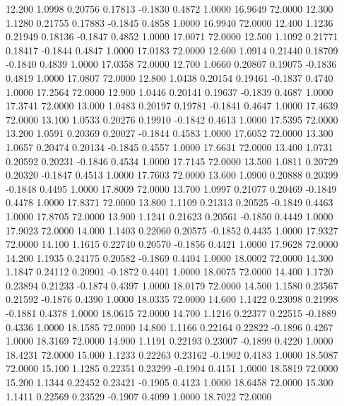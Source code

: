   12.200   1.0998   0.20756   0.17813  -0.1830   0.4872   1.0000  16.9649  72.0000
  12.300   1.1280   0.21755   0.17883  -0.1845   0.4858   1.0000  16.9940  72.0000
  12.400   1.1236   0.21949   0.18136  -0.1847   0.4852   1.0000  17.0071  72.0000
  12.500   1.1092   0.21771   0.18417  -0.1844   0.4847   1.0000  17.0183  72.0000
  12.600   1.0914   0.21440   0.18709  -0.1840   0.4839   1.0000  17.0358  72.0000
  12.700   1.0660   0.20807   0.19075  -0.1836   0.4819   1.0000  17.0807  72.0000
  12.800   1.0438   0.20154   0.19461  -0.1837   0.4740   1.0000  17.2564  72.0000
  12.900   1.0446   0.20141   0.19637  -0.1839   0.4687   1.0000  17.3741  72.0000
  13.000   1.0483   0.20197   0.19781  -0.1841   0.4647   1.0000  17.4639  72.0000
  13.100   1.0533   0.20276   0.19910  -0.1842   0.4613   1.0000  17.5395  72.0000
  13.200   1.0591   0.20369   0.20027  -0.1844   0.4583   1.0000  17.6052  72.0000
  13.300   1.0657   0.20474   0.20134  -0.1845   0.4557   1.0000  17.6631  72.0000
  13.400   1.0731   0.20592   0.20231  -0.1846   0.4534   1.0000  17.7145  72.0000
  13.500   1.0811   0.20729   0.20320  -0.1847   0.4513   1.0000  17.7603  72.0000
  13.600   1.0900   0.20888   0.20399  -0.1848   0.4495   1.0000  17.8009  72.0000
  13.700   1.0997   0.21077   0.20469  -0.1849   0.4478   1.0000  17.8371  72.0000
  13.800   1.1109   0.21313   0.20525  -0.1849   0.4463   1.0000  17.8705  72.0000
  13.900   1.1241   0.21623   0.20561  -0.1850   0.4449   1.0000  17.9023  72.0000
  14.000   1.1403   0.22060   0.20575  -0.1852   0.4435   1.0000  17.9327  72.0000
  14.100   1.1615   0.22740   0.20570  -0.1856   0.4421   1.0000  17.9628  72.0000
  14.200   1.1935   0.24175   0.20582  -0.1869   0.4404   1.0000  18.0002  72.0000
  14.300   1.1847   0.24112   0.20901  -0.1872   0.4401   1.0000  18.0075  72.0000
  14.400   1.1720   0.23894   0.21233  -0.1874   0.4397   1.0000  18.0179  72.0000
  14.500   1.1580   0.23567   0.21592  -0.1876   0.4390   1.0000  18.0335  72.0000
  14.600   1.1422   0.23098   0.21998  -0.1881   0.4378   1.0000  18.0615  72.0000
  14.700   1.1216   0.22377   0.22515  -0.1889   0.4336   1.0000  18.1585  72.0000
  14.800   1.1166   0.22164   0.22822  -0.1896   0.4267   1.0000  18.3169  72.0000
  14.900   1.1191   0.22193   0.23007  -0.1899   0.4220   1.0000  18.4231  72.0000
  15.000   1.1233   0.22263   0.23162  -0.1902   0.4183   1.0000  18.5087  72.0000
  15.100   1.1285   0.22351   0.23299  -0.1904   0.4151   1.0000  18.5819  72.0000
  15.200   1.1344   0.22452   0.23421  -0.1905   0.4123   1.0000  18.6458  72.0000
  15.300   1.1411   0.22569   0.23529  -0.1907   0.4099   1.0000  18.7022  72.0000
